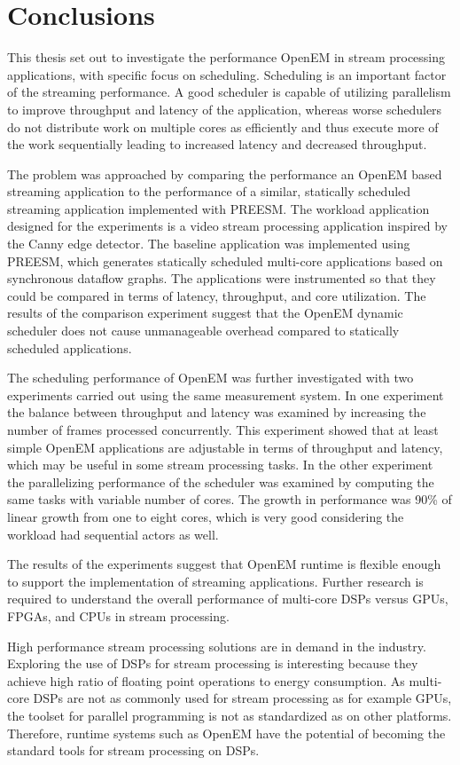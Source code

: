\chapter{Conclusions}
\label{chapter:conclusion}
This thesis set out to investigate the performance OpenEM in stream processing applications, with specific focus on scheduling. Scheduling is an important factor of the streaming performance. A good scheduler is capable of utilizing parallelism to improve throughput and latency of the application, whereas worse schedulers do not distribute work on multiple cores as efficiently and thus execute more of the work sequentially leading to increased latency and decreased throughput.

The problem was approached by comparing the performance an OpenEM based streaming application to the performance of a similar, statically scheduled streaming application implemented with PREESM. The workload application designed for the experiments is a video stream processing application inspired by the Canny edge detector. The baseline application was implemented using PREESM, which generates statically scheduled multi-core applications based on synchronous dataflow graphs. The applications were instrumented so that they could be compared in terms of latency, throughput, and core utilization. The results of the comparison experiment suggest that the OpenEM dynamic scheduler does not cause unmanageable overhead compared to statically scheduled applications.

The scheduling performance of OpenEM was further investigated with two experiments carried out using the same measurement system. In one experiment the balance between throughput and latency was examined by increasing the number of frames processed concurrently. This experiment showed that at least simple OpenEM applications are adjustable in terms of throughput and latency, which may be useful in some stream processing tasks. In the other experiment the parallelizing performance of the scheduler was examined by computing the same tasks with variable number of cores. The growth in performance was 90\% of linear growth from one to eight cores, which is very good considering the workload had sequential actors as well.

The results of the experiments suggest that OpenEM runtime is flexible enough to support the implementation of streaming applications. Further research is required to understand the overall performance of multi-core DSPs versus GPUs, FPGAs, and CPUs in stream processing.

High performance stream processing solutions are in demand in the industry. Exploring the use of DSPs for stream processing is interesting because they achieve high ratio of floating point operations to energy consumption. As multi-core DSPs are not as commonly used for stream processing as for example GPUs, the toolset for parallel programming is not as standardized as on other platforms. Therefore, runtime systems such as OpenEM have the potential of becoming the standard tools for stream processing on DSPs.
